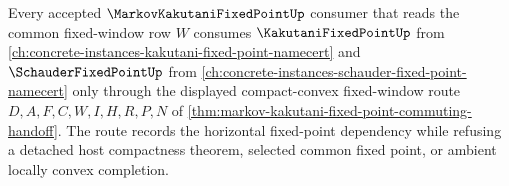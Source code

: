 \begin{proposition}
\label{prop:markov-kakutani-kakutani-schauder-dependency-route}
Every accepted $\MarkovKakutaniFixedPointUp$ consumer that reads the common fixed-window row $W$ consumes $\KakutaniFixedPointUp$ from \autoref{ch:concrete-instances-kakutani-fixed-point-namecert} and $\SchauderFixedPointUp$ from \autoref{ch:concrete-instances-schauder-fixed-point-namecert} only through the displayed compact-convex fixed-window route $D,A,F,C,W,I,H,R,P,N$ of \autoref{thm:markov-kakutani-fixed-point-commuting-handoff}. The route records the horizontal fixed-point dependency while refusing a detached host compactness theorem, selected common fixed point, or ambient locally convex completion.
\end{proposition}
